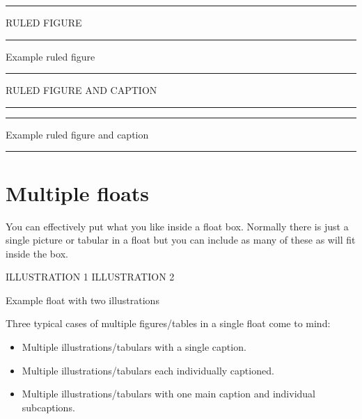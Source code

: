 \begin{shadefigure}
\hrule\vspace{\onelineskip}
RULED FIGURE
\vspace{\onelineskip}\hrule
\vspace{\onelineskip}
\caption{Example ruled figure}\label{fig:rulef}
\end{shadefigure}

\begin{shadefigure}
\hrule\vspace{\onelineskip}
RULED FIGURE AND CAPTION
\vspace{\onelineskip}\hrule
\vspace{0.2pt}\hrule
\vspace{\onelineskip}
\caption{Example ruled figure and caption}\label{fig:rulefcap}
\hrule
\end{shadefigure}


 \section{Multiple floats} \label{sec:multfloats}


You can effectively put what you like inside a float box. Normally there 
is just a single picture or tabular in a float but you can include 
as many of these as will fit inside the box.

 \begin{shadefigure}
 \centering
 \hspace*{\fill} 
   {ILLUSTRATION 1} \hfill {ILLUSTRATION 2} 
 \hspace*{\fill}
 \caption{Example float with two illustrations} \label{fig:mult1}
 \end{shadefigure}

    Three typical cases of multiple figures/tables 
in a single float come to mind:
 \begin{itemize}
 \item Multiple illustrations/tabulars with a single 
caption.
 \item Multiple illustrations/tabulars each 
individually captioned.
 \item Multiple illustrations/tabulars with one 
main caption and individual subcaptions.
 \end{itemize}


